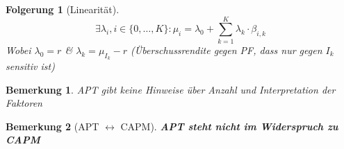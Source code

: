 \documentclass[a4paper]{article}
\theoremstyle{break}
\newtheorem{ann}{Bemerkung}[section]
\newtheorem{der}{Folgerung}[section]
\begin{document}
\begin{der}[Linearität]
    $$\exists \lambda_i, i \in \{0, \dots, K\}:  \mu_i = \lambda_0 + \sum_{k=1}^{K}\lambda_k \cdot \beta_{i,k}$$
    Wobei $\lambda_0 = r$ \& $\lambda_k = \mu_{I_k} -r$ (Überschussrendite gegen PF, dass nur gegen $I_k$ sensitiv ist)
\end{der}

\begin{ann}
  APT gibt keine Hinweise über Anzahl und Interpretation der Faktoren
\end{ann}

\begin{ann}[APT $\leftrightarrow$ CAPM]
    \textbf{APT steht nicht im Widerspruch zu CAPM}
\end{ann}
\end{document}
